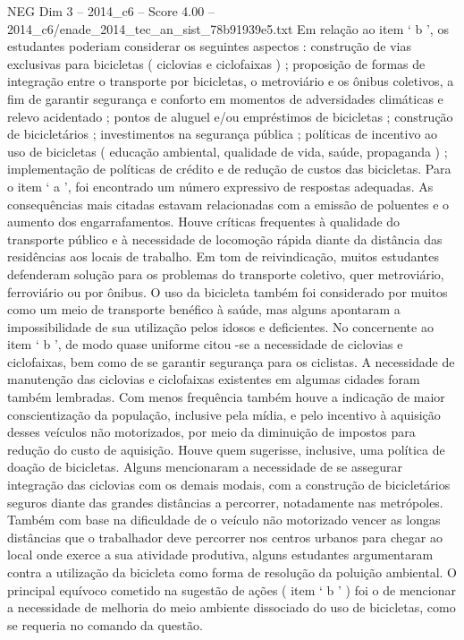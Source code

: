\begin{textsample}{NEG Dim 3 – 2014\_c6 – Score 4.00 – 2014\_c6/enade\_2014\_tec\_an\_sist\_78b91939e5.txt}
Em relação ao item ‘ b ’, os estudantes poderiam considerar os seguintes aspectos : construção de vias exclusivas para bicicletas ( ciclovias e ciclofaixas ) ; proposição de formas de integração entre o transporte por bicicletas, o metroviário e os ônibus coletivos, a fim de garantir segurança e conforto em momentos de adversidades climáticas e relevo acidentado ; pontos de aluguel e/ou empréstimos de bicicletas ; construção de bicicletários ; investimentos na segurança pública ; políticas de incentivo ao uso de bicicletas ( educação ambiental, qualidade de vida, saúde, propaganda ) ; implementação de políticas de crédito e de redução de custos das bicicletas.
Para o item ‘ a ’, foi encontrado um número expressivo de respostas adequadas.
As consequências mais citadas estavam relacionadas com a emissão de poluentes e o aumento dos engarrafamentos.
Houve críticas frequentes à qualidade do transporte público e à necessidade de locomoção rápida diante da distância das residências aos locais de trabalho.
Em tom de reivindicação, muitos estudantes defenderam solução para os problemas do transporte coletivo, quer metroviário, ferroviário ou por ônibus.
O uso da bicicleta também foi considerado por muitos como um meio de transporte benéfico à saúde, mas alguns apontaram a impossibilidade de sua utilização pelos idosos e deficientes.
No concernente ao item ‘ b ’, de modo quase uniforme citou -se a necessidade de ciclovias e ciclofaixas, bem como de se garantir segurança para os ciclistas.
A necessidade de manutenção das ciclovias e ciclofaixas existentes em algumas cidades foram também lembradas.
Com menos frequência também houve a indicação de maior conscientização da população, inclusive pela mídia, e pelo incentivo à aquisição desses veículos não motorizados, por meio da diminuição de impostos para redução do custo de aquisição.
Houve quem sugerisse, inclusive, uma política de doação de bicicletas.
Alguns mencionaram a necessidade de se assegurar integração das ciclovias com os demais modais, com a construção de bicicletários seguros diante das grandes distâncias a percorrer, notadamente nas metrópoles.
Também com base na dificuldade de o veículo não motorizado vencer as longas distâncias que o trabalhador deve percorrer nos centros urbanos para chegar ao local onde exerce a sua atividade produtiva, alguns estudantes argumentaram contra a utilização da bicicleta como forma de resolução da poluição ambiental.
O principal equívoco cometido na sugestão de ações ( item ‘ b ’ ) foi o de mencionar a necessidade de melhoria do meio ambiente dissociado do uso de bicicletas, como se requeria no comando da questão.

\end{textsample}

